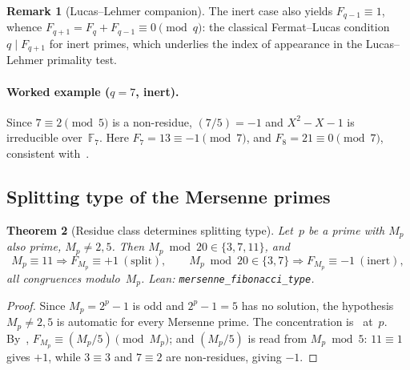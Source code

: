 \documentclass[11pt]{amsart}
\newtheorem{Theorem}{Theorem}[section]
\theoremstyle{definition}
\newtheorem{Remark}[Theorem]{Remark}
\newcommand{\Mp}{M_{p}}
\newcommand{\lean}[1]{\texttt{#1}}
\begin{document}
\begin{Remark}[Lucas--Lehmer companion]\label{rem:fib-companion}
The inert case also yields $F_{q-1}\equiv1$, whence
$F_{q+1}=F_{q}+F_{q-1}\equiv0\pmod{q}$: the classical Fermat--Lucas
condition $q\mid F_{q+1}$ for inert primes, which underlies the index of
appearance in the Lucas--Lehmer primality test.
\end{Remark}

\paragraph{Worked example ($q=7$, inert).}
Since $7\equiv2\pmod5$ is a non-residue, $(7/5)=-1$ and $X^{2}-X-1$ is
irreducible over~$\mathbb{F}_{7}$.  Here $F_{7}=13\equiv-1\pmod{7}$, and
$F_{8}=21\equiv0\pmod7$, consistent with~.

\subsection{Splitting type of the Mersenne primes}
\label{ssec:fib-mersenne}

\begin{Theorem}[Residue class determines splitting type]\label{thm:residue-split}
Let~$p$ be a prime with $\Mp$ also prime, $\Mp\neq2,5$.  Then
$\Mp\bmod20\in\{3,7,11\}$, and
\[
  \Mp\equiv11\Rightarrow F_{\Mp}\equiv+1\ (\text{split}),
  \qquad
  \Mp\bmod20\in\{3,7\}\Rightarrow F_{\Mp}\equiv-1\ (\text{inert}),
\]
all congruences modulo~$\Mp$.
\emph{Lean:} \lean{mersenne\_fibonacci\_type}.
\end{Theorem}

\begin{proof}
Since $\Mp=2^{p}-1$ is odd and $2^{p}-1=5$ has no solution, the hypothesis $\Mp\neq2,5$ is automatic for every Mersenne prime.  The concentration is~ at~$p$.
By~, $F_{\Mp}\equiv(\Mp/5)\pmod{\Mp}$; and
$(\Mp/5)$ is read from $\Mp\bmod5$: $11\equiv1$ gives $+1$, while
$3\equiv3$ and $7\equiv2$ are non-residues, giving $-1$.
\end{proof}
\end{document}

